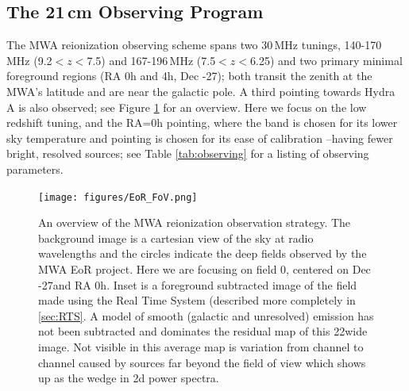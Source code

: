 \documentclass[twolcolumn,iop]{emulateapj}
\begin{document}
\subsection{The 21\,cm Observing Program}
The MWA reionization observing scheme spans two 30\,MHz tunings, 140-170\,MHz (9.2$<z<$7.5) and 167-196\,MHz (7.5$<z<$6.25) and two primary minimal foreground regions (RA 0h and 4h, Dec -27\arcdeg); both transit the zenith at the MWA's  latitude and are near the galactic pole. A third pointing towards Hydra A is also observed; see Figure \ref{fig:fields} for an overview. Here we focus on the low redshift tuning, and the RA=0h pointing, where the band is chosen for its lower sky temperature and pointing is chosen for its ease of calibration --having fewer bright, resolved sources; see Table \ref{tab:observing} for a listing of observing parameters.


\begin{figure}[htbp]
\begin{center}
\texttt{[image: figures/EoR\_FoV.png]}
\caption{An overview of the MWA reionization observation strategy. The background image is a cartesian view of the sky at radio wavelengths and the circles indicate the deep fields observed by the MWA EoR project.  Here we are focusing on field 0, centered on Dec -27\arcdeg and RA 0h. Inset is a foreground subtracted image of the field made using the Real Time System (described more completely in \ref{sec:RTS}. A model of smooth (galactic and unresolved) emission has not been subtracted and dominates the residual map of this 22\arcdeg wide image. Not visible in this average map is variation from channel to channel caused by sources far beyond the field of view which shows up as the wedge in 2d power spectra.}
\label{fig:fields}
\end{center}
\end{figure}

\end{document}
